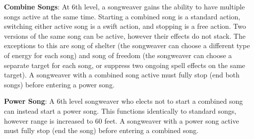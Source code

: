 \textbf{Combine Songs}: At 6th level, a songweaver gains the ability to have multiple songs active at the same time. Starting a combined song is a standard action, switching either active song is a swift action, and stopping is a free action. Two versions of the same song can be active, however their effects do not stack. The exceptions to this are song of shelter (the songweaver can choose a different type of energy for each song) and song of freedom (the songweaver can choose a separate target for each song, or suppress two ongoing spell effects on the same target). A songweaver with a combined song active must fully stop (end both songs) before entering a power song.

\textbf{Power Song}: A 6th level songweaver who elects not to start a combined song can instead start a power song. This functions identically to standard songs, however range is increased to 60 feet. A songweaver with a power song active must fully stop (end the song) before entering a combined song.

